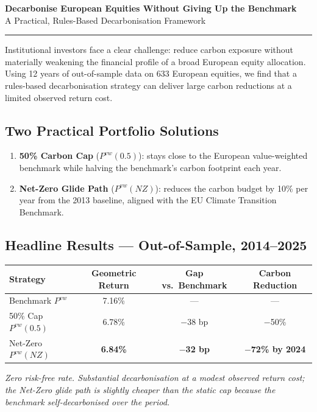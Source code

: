 \documentclass[10pt,a4paper]{article}
\begin{document}
\begin{center}
    {\LARGE \textbf{Decarbonise European Equities Without Giving Up the Benchmark}}\\[0.10cm]
    {\large A Practical, Rules-Based Decarbonisation Framework}
\end{center}
\rule{\linewidth}{1pt}
\vspace{-0.25cm}

Institutional investors face a clear challenge: reduce carbon exposure
without materially weakening the financial profile of a broad European
equity allocation. Using 12 years of out-of-sample data on 633 European
equities, we find that a rules-based decarbonisation strategy can deliver
large carbon reductions at a limited observed return cost.

\subsection{Two Practical Portfolio Solutions}
\begin{enumerate}[leftmargin=*, itemsep=0pt, topsep=2pt]
    \item \textbf{50\% Carbon Cap} ($P^{vw}(0.5)$): stays close to the
    European value-weighted benchmark while halving the benchmark's carbon
    footprint each year.
    \item \textbf{Net-Zero Glide Path} ($P^{vw}(NZ)$): reduces the carbon
    budget by 10\% per year from the 2013 baseline, aligned with the EU
    Climate Transition Benchmark.
\end{enumerate}

\subsection{Headline Results --- Out-of-Sample, 2014--2025}
\begin{center}
\renewcommand{\arraystretch}{1.15}
\colorbox{black!5}{%
\begin{tabular}{lccc}
\toprule
\textbf{Strategy} & \textbf{Geometric Return} & \textbf{Gap vs.\ Benchmark} & \textbf{Carbon Reduction} \\
\midrule
Benchmark $P^{vw}$       & 7.16\%             & ---                 & ---                      \\
50\% Cap $P^{vw}(0.5)$   & 6.78\%             & $-$38 bp            & $-$50\%                  \\
Net-Zero $P^{vw}(NZ)$    & \textbf{6.84\%}    & \textbf{$-$32 bp}   & \textbf{$-$72\% by 2024} \\
\bottomrule
\end{tabular}}
\end{center}
\vspace{-2pt}
\begin{center}
{\footnotesize\textit{Zero risk-free rate. Substantial decarbonisation at a
modest observed return cost; the Net-Zero glide path is slightly cheaper
than the static cap because the benchmark self-decarbonised over the
period.}}
\end{center}
\end{document}
